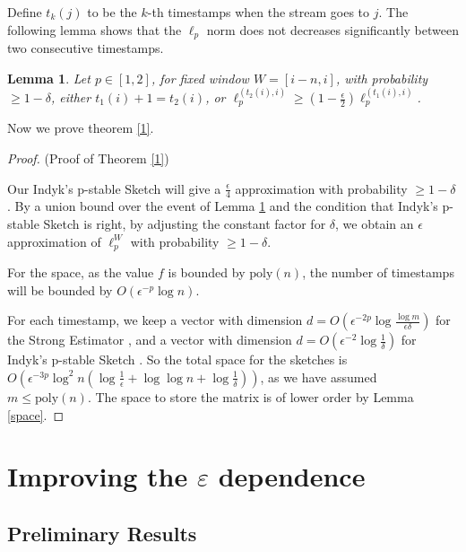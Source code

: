 \documentclass{article}
\newcommand{\est}{\textsf{Strong Estimator }}
\newcommand{\ind}{\textsf{Indyk's p-stable Sketch }}
\newcommand{\eps}{\varepsilon}
\theoremstyle{plain}
\newtheorem{lem}[theorem]{Lemma}
\begin{document}
Define $t_k(j)$ to be the $k$-th timestamps when the stream goes to $j$. The following lemma shows that the $\ell_p$ norm does not decreases significantly between two consecutive timestamps.
\begin{lem}\label{Eps Approx}
    Let $p \in [1, 2]$, for fixed window $W = [i - n, i]$, with probability $\ge 1 - \delta$, either $t_1(i) + 1 = t_2(i)$, or $\ell_p ^ {(t_2(i), i)} \ge (1 - \frac {\epsilon}2) \ell_p ^ {(t_1(i), i)}$. 
\end{lem}























Now we prove theorem \ref{1}. 
\begin{proof}(Proof of Theorem \ref{1})

Our \ind will give a $\frac {\epsilon}{4}$ approximation with probability $\ge 1 - \delta$. By a union bound over the event of Lemma \ref{Eps Approx} and the condition that \ind is right, by adjusting the constant factor for $\delta$, we obtain an $\epsilon$ approximation of $\ell_p ^ W$ with probability $\ge 1 - \delta$.

 For the space, as the value $f$ is bounded by $\text{poly}(n)$, the number of timestamps will be bounded by $O(\epsilon ^ {-p} \log n)$. 
 
 For each timestamp, we keep a vector with dimension $d = O(\epsilon ^ {-2p} \log \frac {\log m}{\epsilon \delta})$ for the \est, and a vector with dimension $d = O(\epsilon ^ {-2} \log \frac 1{\delta})$ for \ind. So the total space for the sketches is $O(\epsilon ^ {-3p} \log ^ 2n (\log \frac{1}{\epsilon} + \log \log n + \log \frac 1{\delta}))$, as we have assumed $m\le \text{poly}(n)$. The space to store the matrix is of lower order by Lemma \ref{space}.

\end{proof}


 
\section{Improving the $\eps$ dependence}
\subsection{Preliminary Results} 
\end{document}
